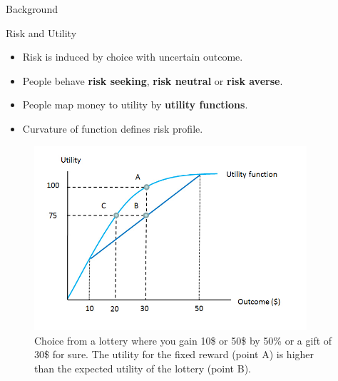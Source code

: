 \begin{exampleblock}{Background}


\Large{Risk and Utility}

\normalsize

\begin{itemize}
    \item Risk is induced by choice with uncertain outcome.
    \item People behave \textbf{risk seeking}, \textbf{risk neutral} or \textbf{risk averse}.
\end{itemize}

\begin{itemize}
    \item People map money to utility by \textbf{utility functions}.
    \item Curvature of function defines risk profile.
\end{itemize}


\begin{figure}
  \centering
    \includegraphics[width=0.9\textwidth]{img/background/riskaversion.jpg}
  \caption{Choice from a lottery where you gain 10\$ or 50\$ by 50\% or a gift of 30\$ for sure. The utility for the fixed reward (point A) is higher than the expected utility of the lottery (point B).}
  
\end{figure}



\end{exampleblock}
